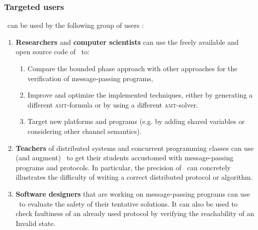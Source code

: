 \subsubsection{Targeted users}
%
\MPass\ can be used by the following group of users :
%
\begin{enumerate}
%
\item \textbf{Researchers} and \textbf{computer scientists} can use the freely available and open source code of \MPass\ to:
\begin{enumerate}
\item Compare the bounded phase approach with other approaches for the verification of message-passing programs,
\item Improve and optimize the implemented techniques,
either by generating a different \textsc{amt}-formula or by using a different \textsc{amt}-solver.
\item Target new platforms and programs (e.g. by adding shared variables or considering other channel semantics).
\end{enumerate}
%  
\item \textbf{Teachers} of distributed  systems  and concurrent programming classes can use (and augment) \MPass\ 
  to get their students accustomed with message-passing programs and protocols.
  In particular, the precision of \MPass\ can concretely illustrates the difficulty of writing a correct distributed protocol or algorithm.
%
\item \textbf{Software designers} that are working on message-passing programs can use \MPass\ to evaluate the safety of their tentative solutions.
  It can also be used to check faultiness of an already used protocol by verifying the reachability of an Invalid state.
%
\end{enumerate}